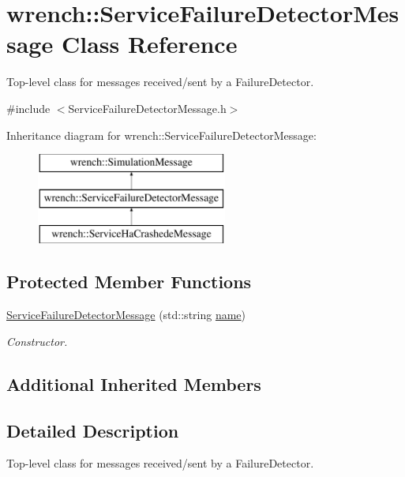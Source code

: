 \hypertarget{classwrench_1_1_service_failure_detector_message}{}\section{wrench\+:\+:Service\+Failure\+Detector\+Message Class Reference}
\label{classwrench_1_1_service_failure_detector_message}


Top-\/level class for messages received/sent by a Failure\+Detector.  




{\ttfamily \#include $<$Service\+Failure\+Detector\+Message.\+h$>$}

Inheritance diagram for wrench\+:\+:Service\+Failure\+Detector\+Message\+:\begin{figure}[H]
\begin{center}
\leavevmode
\includegraphics[height=3.000000cm]{classwrench_1_1_service_failure_detector_message}
\end{center}
\end{figure}
\subsection*{Protected Member Functions}
\begin{DoxyCompactItemize}
\item 
\hyperlink{classwrench_1_1_service_failure_detector_message_a96258a4a4050be33122920b1afabc3d2}{Service\+Failure\+Detector\+Message} (std\+::string \hyperlink{classwrench_1_1_simulation_message_ab224f6dd8ec5ee2e7f65bfcdf2b8a86b}{name})
\begin{DoxyCompactList}\small\item\em Constructor. \end{DoxyCompactList}\end{DoxyCompactItemize}
\subsection*{Additional Inherited Members}


\subsection{Detailed Description}
Top-\/level class for messages received/sent by a Failure\+Detector. 

